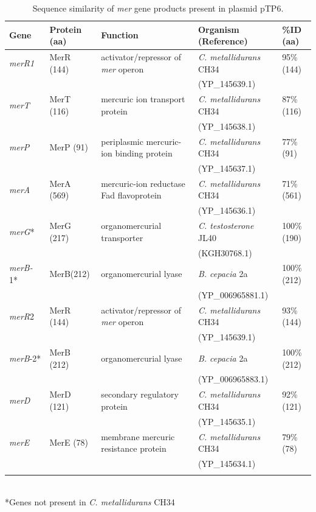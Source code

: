 \begin{table}
\caption{Sequence similarity of \textit{mer} gene products present in plasmid pTP6.\\}
\label{table:46}%
{%
\begin{tabular*}{\columnwidth}{@{}lllll@{}}
\hline
 \textbf{Gene} & \textbf{Protein (aa)} & \textbf{Function} & \textbf{Organism (Reference)} & \textbf{\%ID (aa)}\\
 \hline
 \textit{merR1} & MerR (144) & activator/repressor of \textit{mer} operon & \textit{C. metallidurans} CH34 & 95\% (144) \\
  &  &  &  (YP\_145639.1) &  \\
 \textit{merT} & MerT (116) & mercuric ion transport protein & \textit{C. metallidurans} CH34  & 87\% (116) \\ 
   &  &  &  (YP\_145638.1) &  \\
 \textit{merP} & MerP (91) & periplasmic mercuric-ion binding protein & \textit{C. metallidurans} CH34  & 77\% (91) \\
    &  &  &  (YP\_145637.1) &  \\
 \textit{merA} & MerA (569) & mercuric-ion reductase Fad flavoprotein & \textit{C. metallidurans} CH34  & 71\% (561) \\ 
     &  &  &  (YP\_145636.1) &  \\
 \textit{merG}* & MerG (217) & organomercurial transporter & \textit{C. testosterone} JL40  & 100\% (190) \\ 
     &  &  &  (KGH30768.1) &  \\
 \textit{merB-}1* & MerB(212) & organomercurial lyase & \textit{B. cepacia} 2a  & 100\% (212) \\
    &  &  &  (YP\_006965881.1) &  \\
\textit{merR}2 & MerR (144) &
activator/repressor of \textit{mer} operon & \textit{C. metallidurans} CH34  & 93\% (144)\\
&&&(YP\_145639.1)&\\
\textit{merB}-2* & MerB (212) & organomercurial lyase & \textit{B. cepacia} 2a  & 100\% (212) \\
    &  &  &  (YP\_006965883.1) &  \\
\textit{merD} & MerD (121) & secondary regulatory protein & \textit{C. metallidurans} CH34  & 92\% (121) \\
    &  &  &   (YP\_145635.1) &  \\
\textit{merE} & MerE (78) & membrane mercuric resistance protein & \textit{C. metallidurans} CH34   & 79\% (78)\\
    &  &  &  (YP\_145634.1) &  \\
\\
\hline
\hline
\end{tabular*}
}
\\
{
\footnotesize{*Genes not present in \textit{C. metallidurans} CH34}
}
\end{table}

